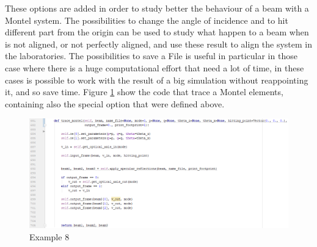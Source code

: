 \noindent These options are added in order to study better the behaviour of a beam with a Montel system. The possibilities to change the angle of incidence and to hit different part from the origin can be used to study what happen to a beam when is not aligned, or not perfectly aligned, and use these result to align the system in the laboratories. The possibilities to save a File is useful in particular in those case where there is a huge computational effort that need a lot of time, in these cases is possible to work with the result of a big simulation without reappointing it, and so save time. Figure \ref{fig: CodeTraceMontel} show the code that trace a Montel elements, containing also the special option that were defined above.
\begin{figure}[H]
%
\centering
%
\includegraphics[width=1.\textwidth]{Immagini/Chapter3/CodeTraceMontel}
%
\caption{Example 8}
%
\label{fig: CodeTraceMontel}
%
\end{figure}